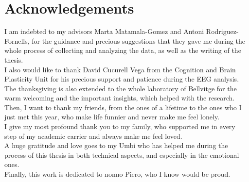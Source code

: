 \chapter*{Acknowledgements}
I am indebted to my advisors Marta Matamala-Gomez and Antoni Rodriguez-Fornells, for the guidance and precious suggestions that they gave me during the whole process of collecting and analyzing the data, as well as the writing of the thesis. \\
I also would like to thank David Cucurell Vega from the Cognition and Brain Plasticity Unit for his precious support and patience during the EEG analysis. \\
The thanksgiving is also extended to the whole laboratory of Bellvitge for the warm welcoming and the important insights, which helped with the research. \\
Then, I want to thank my friends, from the ones of a lifetime to the ones who I just met this year, who make life funnier and never make me feel lonely. \\
I give my most profound thank you to my family, who supported me in every step of my academic carrier and always make me feel loved. \\ A huge gratitude and love goes to my Umbi who has helped me during the process of this thesis in both technical aspects, and especially in the emotional ones. \\
Finally, this work is dedicated to nonno Piero, who I know would be proud.